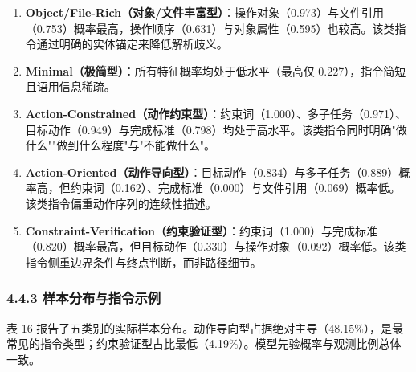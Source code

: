\documentclass[12pt,a4paper,openany,oneside]{ctexrep}
\begin{document}
\begin{enumerate}
\item[1.] \textbf{Object/File-Rich（对象/文件丰富型）}：操作对象（0.973）与文件引用（0.753）概率最高，操作顺序（0.631）与对象属性（0.595）也较高。该类指令通过明确的实体锚定来降低解析歧义。
\item[2.] \textbf{Minimal（极简型）}：所有特征概率均处于低水平（最高仅 0.227），指令简短且语用信息稀疏。
\item[3.] \textbf{Action-Constrained（动作约束型）}：约束词（1.000）、多子任务（0.971）、目标动作（0.949）与完成标准（0.798）均处于高水平。该类指令同时明确"做什么""做到什么程度"与"不能做什么"。
\item[4.] \textbf{Action-Oriented（动作导向型）}：目标动作（0.834）与多子任务（0.889）概率高，但约束词（0.162）、完成标准（0.000）与文件引用（0.069）概率低。该类指令偏重动作序列的连续性描述。
\item[5.] \textbf{Constraint-Verification（约束验证型）}：约束词（1.000）与完成标准（0.820）概率最高，但目标动作（0.330）与操作对象（0.092）概率低。该类指令侧重边界条件与终点判断，而非路径细节。
\end{enumerate}


\subsubsection{4.4.3 样本分布与指令示例}


表 16 报告了五类别的实际样本分布。动作导向型占据绝对主导（48.15\%），是最常见的指令类型；约束验证型占比最低（4.19\%）。模型先验概率与观测比例总体一致。


\begin{table}[htbp]
\centering
\caption{表 16：潜在类别样本分布}
\small
{}
\end{table}
\end{document}
